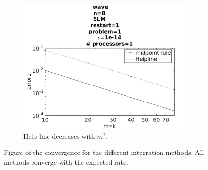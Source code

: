\begin{figure}[H]
\begin{subfigure}[b]{0.30\textwidth}
        \end{subfigure}
        \begin{subfigure}[b]{0.30\textwidth}
                \includegraphics[width=\textwidth]{../MATLAB/fig/intconvmid.jpg}
                \caption{ Help line decreases with $m^2$. }
                \label{fig:intconvmid}
        \end{subfigure}
        
        
        \caption{Figure of the convergence for the different integration methods. All methods converge with the expected rate. }
        \label{fig:intconv}
\end{figure}



